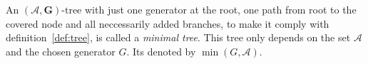 \begin{definition}
  An $(\mathcal{A},\mathbf{G})\text{-tree}$ with just one generator at the root, one path from root to the covered node and all neccessarily added branches, to make it comply with definition~\ref{def:tree}, is called a \emph{minimal tree}. This tree only depends on the set $\mathcal{A}$ and the chosen generator $G$. Its denoted by $\min(G, \mathcal{A})$.
\end{definition}


\begin{figure}[!h]
  \centering
  \begin{tikzpicture}[x=0.75pt,y=0.75pt,yscale=-1,xscale=1]
    

\end{tikzpicture}
\end{figure}
